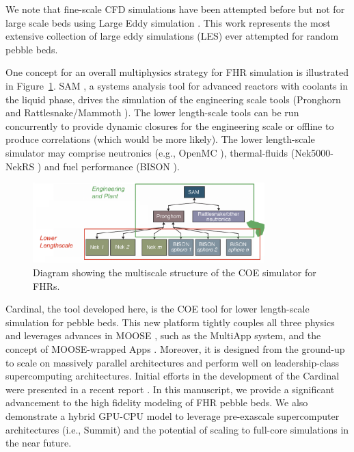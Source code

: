 We note that fine-scale CFD simulations have been attempted before but not for large scale beds using Large Eddy simulation \cite{vanstaden2018}. This work represents the most extensive collection of large eddy simulations  (LES) ever attempted for random pebble beds.

One concept for an overall multiphysics strategy for FHR simulation is illustrated in Figure~\ref{f:fhr1}. SAM \cite{hu2017sam}, a systems analysis tool for advanced reactors with coolants in the liquid phase, drives the simulation of the engineering scale tools (Pronghorn and Rattlesnake/Mammoth \cite{wang1}). The lower length-scale tools can be run concurrently to provide dynamic closures for the engineering scale or offline to produce correlations (which would be more likely). The lower length-scale simulator may comprise neutronics (e.g., OpenMC \cite{romano2013openmc}), thermal-fluids (Nek5000-NekRS \cite{fischer2008}) and fuel performance (BISON \cite{hales2013triso}).

\begin{figure}[!h]
\centering
\includegraphics[clip=true,width=0.8\textwidth]{Figures/fhr_graph}
\caption{Diagram showing the multiscale structure of the COE simulator for FHRs.}
\label{f:fhr1}
\end{figure}

Cardinal, the tool developed here, is the COE tool for lower length-scale simulation for pebble beds. This new platform tightly couples all three physics and leverages advances in MOOSE \cite{gaston2009moose, permann2020moose}, such as the MultiApp system, and the concept of MOOSE-wrapped Apps \cite{gaston2015physics}. Moreover, it is designed from the ground-up to scale on massively parallel architectures and perform well on leadership-class supercomputing architectures. Initial efforts in the development of the Cardinal were presented in a recent report \cite{cardinal}. In this manuscript, we provide a significant advancement to the high fidelity modeling of FHR pebble beds. We also demonstrate a hybrid GPU-CPU model to leverage pre-exascale supercomputer architectures (i.e., Summit) and the potential of scaling to full-core simulations in the near future.

